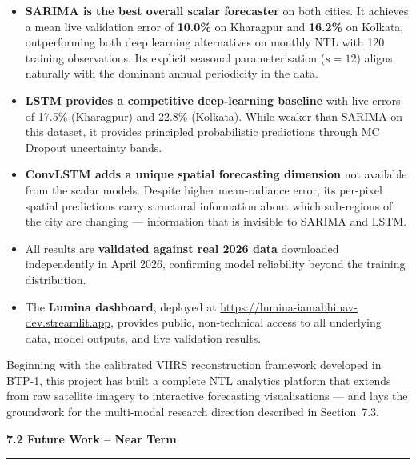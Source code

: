 \documentclass[12pt,a4paper]{report}
\begin{document}
\begin{itemize}[leftmargin=1.5cm]
    \item \textbf{SARIMA is the best overall scalar forecaster} on both cities. It achieves a mean live validation error of \textbf{10.0\%} on Kharagpur and \textbf{16.2\%} on Kolkata, outperforming both deep learning alternatives on monthly NTL with 120 training observations. Its explicit seasonal parameterisation ($s=12$) aligns naturally with the dominant annual periodicity in the data.

    \item \textbf{LSTM provides a competitive deep-learning baseline} with live errors of 17.5\% (Kharagpur) and 22.8\% (Kolkata). While weaker than SARIMA on this dataset, it provides principled probabilistic predictions through MC Dropout uncertainty bands.

    \item \textbf{ConvLSTM adds a unique spatial forecasting dimension} not available from the scalar models. Despite higher mean-radiance error, its per-pixel spatial predictions carry structural information about which sub-regions of the city are changing --- information that is invisible to SARIMA and LSTM.

    \item All results are \textbf{validated against real 2026 data} downloaded independently in April 2026, confirming model reliability beyond the training distribution.

    \item The \textbf{Lumina dashboard}, deployed at \url{https://lumina-iamabhinav-dev.streamlit.app}, provides public, non-technical access to all underlying data, model outputs, and live validation results.
\end{itemize}

Beginning with the calibrated VIIRS reconstruction framework developed in BTP-1, this project has built a complete NTL analytics platform that extends from raw satellite imagery to interactive forecasting visualisations --- and lays the groundwork for the multi-modal research direction described in Section~7.3.

\vspace{0.5cm}
\begin{center}
    \hypertarget{sec:s72}{}%
    {\large \textbf{7.2 Future Work -- Near Term}}\\[0.3cm]
    \noindent\rule{\linewidth}{0.4pt}\\[0.5cm]
\end{center}
\end{document}
